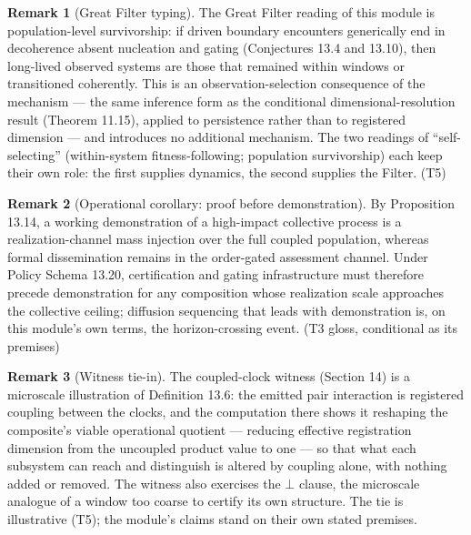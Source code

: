 \documentclass[11pt]{article}
\theoremstyle{definition}
\newtheorem{remark}{Remark}
\begin{document}
\begin{remark}[Great Filter typing]
The Great Filter reading of this module is population-level survivorship: if driven boundary encounters generically end in decoherence absent nucleation and gating (Conjectures 13.4 and 13.10), then long-lived observed systems are those that remained within windows or transitioned coherently. This is an observation-selection consequence of the mechanism --- the same inference form as the conditional dimensional-resolution result (Theorem 11.15), applied to persistence rather than to registered dimension --- and introduces no additional mechanism. The two readings of ``self-selecting'' (within-system fitness-following; population survivorship) each keep their own role: the first supplies dynamics, the second supplies the Filter. (T5)
\end{remark}

\begin{remark}[Operational corollary: proof before demonstration]
By Proposition 13.14, a working demonstration of a high-impact collective process is a realization-channel mass injection over the full coupled population, whereas formal dissemination remains in the order-gated assessment channel. Under Policy Schema 13.20, certification and gating infrastructure must therefore precede demonstration for any composition whose realization scale approaches the collective ceiling; diffusion sequencing that leads with demonstration is, on this module's own terms, the horizon-crossing event. (T3 gloss, conditional as its premises)
\end{remark}

\begin{remark}[Witness tie-in]
The coupled-clock witness (Section 14) is a microscale illustration of Definition 13.6: the emitted pair interaction is registered coupling between the clocks, and the computation there shows it reshaping the composite's viable operational quotient --- reducing effective registration dimension from the uncoupled product value to one --- so that what each subsystem can reach and distinguish is altered by coupling alone, with nothing added or removed. The witness also exercises the $\bot$ clause, the microscale analogue of a window too coarse to certify its own structure. The tie is illustrative (T5); the module's claims stand on their own stated premises.
\end{remark}
\end{document}
